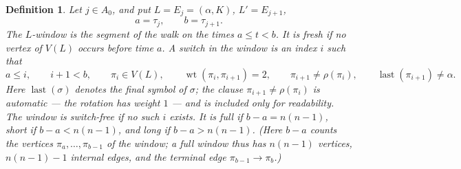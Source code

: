 \documentclass[11pt]{article}
\newtheorem{definition}[theorem]{Definition}
\DeclareMathOperator{\wt}{wt}
\begin{document}
\begin{definition}\label{def:windowmodes}
Let \(j\in A_0\), and put \(L=E_j=(\alpha,K)\), \(L'=E_{j+1}\),
\[
  a=\tau_j,\qquad b=\tau_{j+1}.
\]
The \emph{\(L\)-window} is the segment of the walk on the times \(a\le t<b\).  It is fresh if no
vertex of \(V(L)\) occurs before time \(a\).  A switch in the
window is an index \(i\) such that
\[
  a\le i,\qquad i+1<b,\qquad \pi_i\in V(L),\qquad
  \wt(\pi_i,\pi_{i+1})=2,\qquad
  \pi_{i+1}\ne\rho(\pi_i),\qquad
  \operatorname{last}(\pi_{i+1})\ne \alpha .
\]
Here \(\operatorname{last}(\sigma)\) denotes the final symbol of \(\sigma\); the clause
\(\pi_{i+1}\ne\rho(\pi_i)\) is automatic --- the rotation has weight \(1\) --- and is included
only for readability.  The window is switch-free if no such \(i\) exists.  It is full if \(b-a=n(n-1)\), short if
\(b-a<n(n-1)\), and long if \(b-a>n(n-1)\).  (Here \(b-a\) counts the \emph{vertices}
\(\pi_a,\ldots,\pi_{b-1}\) of the window; a full window thus has \(n(n-1)\) vertices,
\(n(n-1)-1\) internal edges, and the terminal edge \(\pi_{b-1}\to\pi_b\).)
\end{definition}
\end{document}
